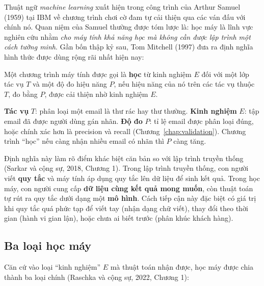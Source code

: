 Thuật ngữ \textit{machine learning} xuất hiện trong công trình của Arthur Samuel (1959) tại IBM về chương trình chơi cờ đam tự cải thiện qua các ván đấu với chính nó. Quan niệm của Samuel thường được tóm lược là: học máy là lĩnh vực nghiên cứu nhằm \textit{cho máy tính khả năng học mà không cần được lập trình một cách tường minh}. Gần bốn thập kỷ sau, Tom Mitchell (1997) đưa ra định nghĩa hình thức được dùng rộng rãi nhất hiện nay:

\begin{definition}
Một chương trình máy tính được gọi là \textbf{học} từ kinh nghiệm $E$ đối với một lớp tác vụ $T$ và một độ đo hiệu năng $P$, nếu hiệu năng của nó trên các tác vụ thuộc $T$, đo bằng $P$, được cải thiện nhờ kinh nghiệm $E$.
\end{definition}

\begin{example}
\textbf{Tác vụ} $T$: phân loại một email là thư rác hay thư thường. \textbf{Kinh nghiệm} $E$: tập email đã được người dùng gán nhãn. \textbf{Độ đo} $P$: tỉ lệ email được phân loại đúng, hoặc chính xác hơn là precision và recall (Chương~\ref{chap:validation}). Chương trình ``học'' nếu càng nhận nhiều email có nhãn thì $P$ càng tăng.
\end{example}

Định nghĩa này làm rõ điểm khác biệt căn bản so với lập trình truyền thống (Sarkar và cộng sự, 2018, Chương 1). Trong lập trình truyền thống, con người viết \textbf{quy tắc} và máy tính áp dụng quy tắc lên dữ liệu để sinh kết quả. Trong học máy, con người cung cấp \textbf{dữ liệu cùng kết quả mong muốn}, còn thuật toán tự rút ra quy tắc dưới dạng một \textbf{mô hình}. Cách tiếp cận này đặc biệt có giá trị khi quy tắc quá phức tạp để viết tay (nhận dạng chữ viết), thay đổi theo thời gian (hành vi gian lận), hoặc chưa ai biết trước (phân khúc khách hàng).


\subsection{Ba loại học máy}

Căn cứ vào loại ``kinh nghiệm'' $E$ mà thuật toán nhận được, học máy được chia thành ba loại chính (Raschka và cộng sự, 2022, Chương 1):

